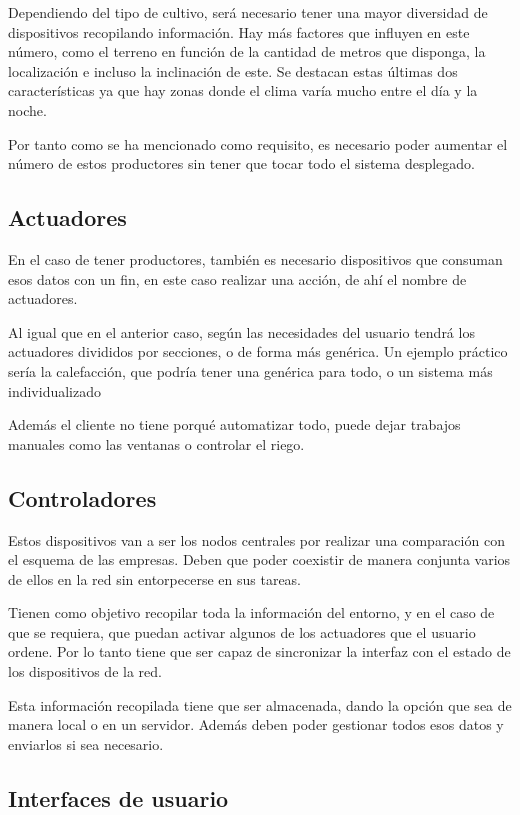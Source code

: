 Dependiendo del tipo de cultivo, será necesario tener una mayor diversidad de dispositivos recopilando información. Hay más factores que influyen en este número, como el terreno en función de la cantidad de metros que disponga, la localización e incluso la inclinación de este. Se destacan estas últimas dos características ya que hay zonas donde el clima varía mucho entre el día y la noche.


Por tanto como se ha mencionado como requisito, es necesario poder aumentar el número de estos productores sin tener que tocar todo el sistema desplegado.

\subsection{Actuadores}

En el caso de tener productores, también es necesario dispositivos que consuman esos datos con un fin, en este caso realizar una acción, de ahí el nombre de actuadores.

Al igual que en el anterior caso, según las necesidades del usuario tendrá los actuadores divididos por secciones, o de forma más genérica. Un ejemplo práctico sería la calefacción, que podría tener una genérica para todo, o un sistema más individualizado

Además el cliente no tiene porqué automatizar todo, puede dejar trabajos manuales como las ventanas o controlar el riego.

\subsection{Controladores}

Estos dispositivos van a ser los nodos centrales por realizar una comparación con el esquema de las empresas. Deben que poder coexistir de manera conjunta varios de ellos en la red sin entorpecerse en sus tareas.

Tienen como objetivo recopilar toda la información del entorno, y en el caso de que se requiera, que puedan activar algunos de los actuadores que el usuario ordene. Por lo tanto tiene que ser capaz de sincronizar la interfaz con el estado de los dispositivos de la red.

Esta información recopilada tiene que ser almacenada, dando la opción que sea de manera local o en un servidor. Además deben poder gestionar todos esos datos y enviarlos si sea necesario.

\subsection{Interfaces de usuario}

